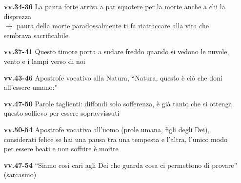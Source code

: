 \documentclass{article}
\begin{document}
\begin{multicols}{2}
{\begin{itemize}
        \item[\textbf{vv.34-36}] La paura forte arriva a par squotere per la morte anche a chi la disprezza
        \\$\rightarrow$ paura della morte paradossalmente ti fa riattaccare alla vita che sembrava sacrificabile
        \item[\textbf{vv.37-41}] Questo timore porta a sudare freddo quando si vedono le nuvole, vento e i lampi verso di noi
        \item[\textbf{vv.43-46}] Apostrofe vocativo alla Natura, ``Natura, questo è ciò che doni all'essere umano:'' 
        \item[\textbf{vv.47-50}] Parole taglienti: diffondi solo sofferenza, è già tanto che si ottenga questo sollievo per essere sopravvissuti
        \item[\textbf{vv.50-54}] Apostrofe vocativo all'uomo (prole umana, figli degli Dei), considerati felice se hai una pausa tra una tempesta e l'altra, l'unico modo per essere beati e non soffrire è morire
        \item[\textbf{vv.47-54}] ``Siamo così cari agli Dei che guarda cosa ci permettono di provare'' (sarcasmo)
    \end{itemize}}
\end{multicols}
\end{document}
